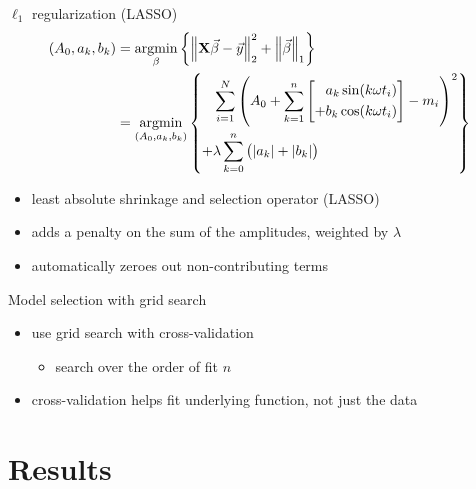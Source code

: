\documentclass{beamer}
\DeclareMathOperator*{\argmin}{argmin}
\begin{document}
\begin{frame}{$\ell_1$ regularization (LASSO)}
  \begin{align*}
    (A_0, a_k, b_k) &=
    \argmin_\beta \qty{
      \norm{\vb{X} \vec\beta - \vec{y}}_2^2 +
      \norm{\vec\beta}_1
    }
    \\ &=
    \argmin_{(A_0, a_k, b_k)} \qty{
    \begin{aligned}
    &\sum_{i=1}^N \qty(
      A_0 +
      \sum_{k=1}^n \qty[
        \begin{aligned}
           & a_k \sin(k \omega t_i)
          \\
          +& b_k \cos(k \omega t_i)
        \end{aligned}
      ] - m_i
    )^2
    \\ +&
    \lambda \sum_{k=0}^n \qty( \abs{a_k} + \abs{b_k} )
    \end{aligned}
    }
  \end{align*}
  \begin{itemize}
  \item least absolute shrinkage and selection operator (LASSO)
  \item adds a penalty on the sum of the amplitudes, weighted by $\lambda$
  \item automatically zeroes out non-contributing terms
  \end{itemize}
\end{frame}

\begin{frame}{Model selection with grid search}
  \begin{itemize}
  \item use grid search with cross-validation
    \begin{itemize}
    \item search over the order of fit $n$
    \end{itemize}
  \item cross-validation helps fit underlying function, not just the data
  \end{itemize}
\end{frame}

\section{Results}
\end{document}
